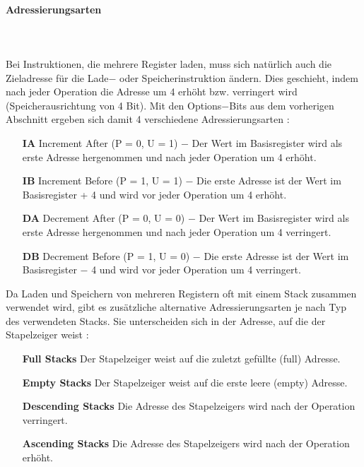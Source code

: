 \documentclass[a4paper, 11pt, onecolumn]{article}
\begin{document}
\paragraph{Adressierungsarten}\label{sec:ldmstmaddr}
~\\ \\
Bei Instruktionen, die mehrere Register laden, muss sich natürlich auch die Zieladresse für die Lade$-$ oder Speicherinstruktion ändern. Dies geschieht, indem nach jeder Operation die Adresse um 4 erhöht bzw. verringert wird (Speicherausrichtung von 4 Bit). Mit den Options$-$Bits aus dem vorherigen Abschnitt ergeben sich damit 4 verschiedene Adressierungsarten \cite{arm:2005}:


\begin{itemize}[labelwidth=2em,leftmargin =\dimexpr{}+\relax, align=parleft]
\item[\textbf{IA}] Increment After (P = 0, U = 1) $-$ Der Wert im Basisregister wird als erste Adresse hergenommen und nach jeder Operation um 4 erhöht.
\item[\textbf{IB}] Increment Before (P = 1, U = 1) $-$ Die erste Adresse ist der Wert im Basisregister + 4 und wird vor jeder Operation um 4 erhöht.
\item[\textbf{DA}] Decrement After (P = 0, U = 0) $-$ Der Wert im Basisregister wird als erste Adresse hergenommen und nach jeder Operation um 4 verringert.
\item[\textbf{DB}] Decrement Before (P = 1, U = 0) $-$ Die erste Adresse ist der Wert im Basisregister $-$ 4 und wird vor jeder Operation um 4 verringert.
\end{itemize}

Da Laden und Speichern von mehreren Registern oft mit einem Stack zusammen verwendet wird, gibt es zusätzliche alternative Adressierungsarten je nach Typ des verwendeten Stacks. Sie unterscheiden sich in der Adresse, auf die der Stapelzeiger weist \cite{arm:2005}:


\begin{itemize}[labelwidth=10em,leftmargin =\dimexpr{}+\relax, align=parleft]
\item[\textbf{Full Stacks}] Der Stapelzeiger weist auf die zuletzt gefüllte (full) Adresse.
\item[\textbf{Empty Stacks}] Der Stapelzeiger weist auf die erste leere (empty) Adresse.
\item[\textbf{Descending Stacks}] Die Adresse des Stapelzeigers wird nach der Operation verringert.
\item[\textbf{Ascending Stacks}] Die Adresse des Stapelzeigers wird nach der Operation erhöht.
\end{itemize}
\end{document}
